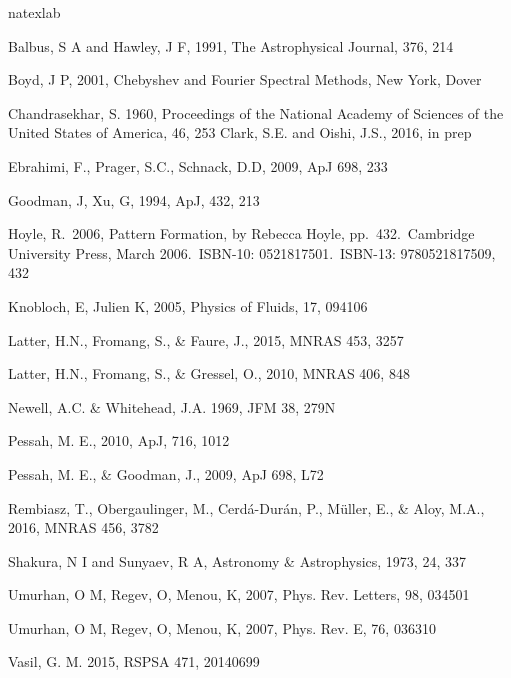 \documentclass{emulateapj}
\begin{document}


\begin{thebibliography}{53}
\expandafter\ifx\csname natexlab\endcsname\relax\def\natexlab#1{#1}\fi

Balbus, S A and Hawley, J F, 1991, The Astrophysical Journal, 376, 214

Boyd, J P, 2001, Chebyshev and Fourier Spectral Methods, New York, Dover

Chandrasekhar, S. 1960, Proceedings of the National Academy of Sciences of the United States of America, 46, 253
Clark, S.E. and Oishi, J.S., 2016, in prep

Ebrahimi, F., Prager, S.C., Schnack, D.D, 2009, ApJ 698, 233

Goodman, J, Xu, G, 1994, ApJ, 432, 213

 Hoyle, R.\ 2006, Pattern
  Formation, by Rebecca Hoyle, pp.~432.~Cambridge University Press,
  March 2006.~ISBN-10: 0521817501.~ISBN-13: 9780521817509, 432

Knobloch, E, Julien K, 2005, Physics of Fluids, 17, 094106

Latter, H.N., Fromang, S., \& Faure, J., 2015, MNRAS 453, 3257

Latter, H.N., Fromang, S., \& Gressel, O., 2010, MNRAS 406, 848

Newell, A.C. \& Whitehead, J.A. 1969, JFM 38, 279N

Pessah, M. E., 2010, ApJ, 716, 1012

Pessah, M. E., \& Goodman, J., 2009, ApJ 698, L72 

Rembiasz, T., Obergaulinger, M., Cerd\'a-Dur\'an, P., M\"uller, E., \& Aloy, M.A., 2016, MNRAS 456, 3782

Shakura, N I and Sunyaev, R A, Astronomy \& Astrophysics, 1973, 24, 337

Umurhan, O M, Regev, O, Menou, K, 2007, Phys. Rev. Letters, 98, 034501

Umurhan, O M, Regev, O, Menou, K, 2007, Phys. Rev. E, 76, 036310

Vasil, G. M. 2015, RSPSA 471, 20140699

\end{thebibliography}
\end{document}
